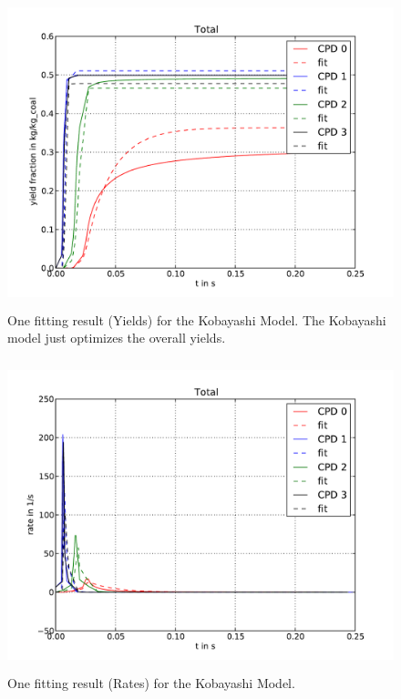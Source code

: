\begin{figure}
\centering%
\includegraphics[height=9cm,angle=0]{Figures/CPD-Fit_result_Kob_Total_Y}
\caption{One fitting result (Yields) for the Kobayashi Model. The Kobayashi model just optimizes the overall yields.}
\label{F_Fit_Kob_Y}
\end{figure}

\begin{figure}
\centering%
\includegraphics[height=9cm,angle=0]{Figures/CPD-Fit_result_Kob_Total_R}
\caption{One fitting result (Rates) for the Kobayashi Model.}
\label{F_Fit_Kob_R}
\end{figure}

